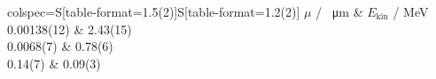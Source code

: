 \begin{tblr}{colspec={S[table-format=1.5(2)]S[table-format=1.2(2)]}}
	{{{$\mu$ / \si{\per\um}}}} & {{{$E_{\mathrm{kin}}$ / \si{\mega\electronvolt}}}} \\
	0.00138(12)                & 2.43(15)                                           \\
	0.0068(7)                  & 0.78(6)                                            \\
	0.14(7)                    & 0.09(3)                                            \\
\end{tblr}
